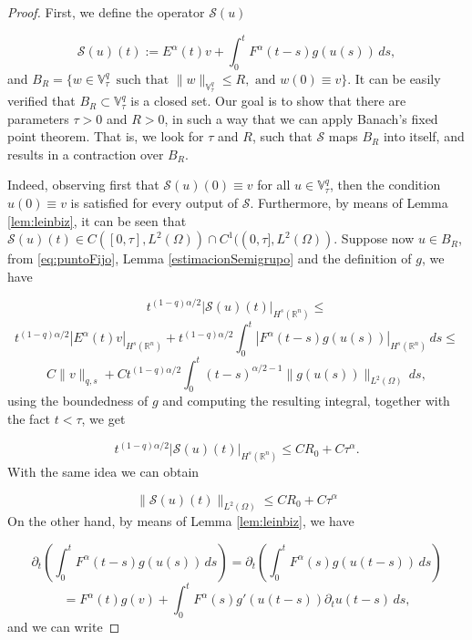 \documentclass{amsart}
\newcommand{\rn}{{\mathbb{R}^n}}
\newcommand{\ele}{L^2(\Omega)}
\newcommand{\fmonio}{g}
\newcommand{\V}{\mathbb{V}^q}
\theoremstyle{remark}
\theoremstyle{definition}
\numberwithin{equation}{section}
\begin{document}
\begin{proof}

First, we define the operator $\mathcal{S}(u)$

\begin{equation}
\mathcal{S}(u)(t) := E^{\alpha}(t)v + \int^{t}_0 F^{\alpha}(t-s)\fmonio(u(s))\,ds, 
\label{eq:puntoFijo}
\end{equation}
and $B_{R} = \{ w \in \V_{\tau} \, \text{ such that } \|w\|_{\V_{\tau}} \leq R, \text{ and } w(0) \equiv v \}$. It can be easily verified that $B_{R} \subset \V_{\tau}$ is a closed set. Our goal is to show that there are parameters $\tau>0$ and $R>0$, in such a way that we can apply Banach's fixed point theorem. That is, we look for $\tau$ and $R$, such that $\mathcal{S}$ maps $B_R$ into itself, and results in a contraction over $B_R$.

 Indeed, observing first that $\mathcal{S}(u)(0) \equiv v$ for all $u \in \V_{\tau}$, then the condition $u(0) \equiv v$ is satisfied for every output of $\mathcal{S}$. Furthermore, by means of Lemma \ref{lem:leinbiz}, it can be seen that $\mathcal{S}(u)(t) \in C([0,\tau],\ele) \cap C^1((0,\tau],\ele)$. Suppose now $u \in B_R$, from \eqref{eq:puntoFijo}, Lemma \ref{estimacionSemigrupo} and the definition of $\fmonio$, we have  

\begin{equation*}
t^{(1-q)\alpha/2}| \mathcal{S}(u)(t) |_{H^s(\rn)} \leq 
\end{equation*}
$$
t^{(1-q)\alpha/2}|E^{\alpha}(t)v|_{H^s(\rn)} + t^{(1-q)\alpha/2}\int^{t}_0 |F^{\alpha}(t-s)\fmonio(u(s))|_{H^s(\rn)}\,ds \leq 
$$
$$C\|v\|_{q,s} + Ct^{(1-q)\alpha/2}\int^{t}_0 (t-s)^{\alpha/2 - 1}\|\fmonio(u(s))\|_{\ele}\,ds, $$
using the boundedness of $g$ and computing the resulting    integral, together with the fact $t<\tau$, we get 

\begin{equation}
t^{(1-q)\alpha/2}| \mathcal{S}(u)(t) |_{H^s(\rn)} \leq CR_0 + C\tau^{\alpha}.
\label{eq:puntoFijo2}
\end{equation}
With the same idea we can obtain

\begin{equation}
\label{eq:puntoFijo2bis}
\| \mathcal{S}(u)(t) \|_{\ele} \leq CR_0 + C\tau^{\alpha}
\end{equation}
On the other hand, by means of Lemma \ref{lem:leinbiz}, we have

\begin{equation}
\label{eq:derivada_semi}
\partial_t \left( \int^{t}_0 F^{\alpha}(t-s)\fmonio(u(s)) \,ds \right) = \partial_t \left( \int^{t}_0 F^{\alpha}(s)\fmonio(u(t-s)) \,ds \right)
\end{equation}
$$= F^{\alpha}(t)\fmonio(v) + \int^{t}_0 F^{\alpha}(s)\fmonio'(u(t-s))\partial_t u(t-s)  \,ds, $$ 
and we can write


\end{proof}
\end{document}
